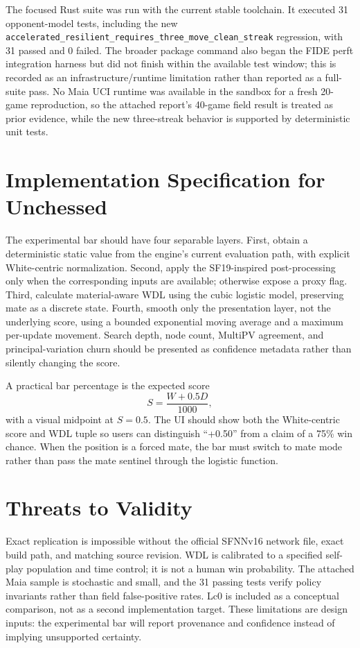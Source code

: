 \documentclass[10pt,conference]{IEEEtran}
\begin{document}
The focused Rust suite was run with the current stable toolchain. It executed 31 opponent-model tests, including the new \texttt{accelerated\_resilient\_requires\_three\_move\_clean\_streak} regression, with 31 passed and 0 failed. The broader package command also began the FIDE perft integration harness but did not finish within the available test window; this is recorded as an infrastructure/runtime limitation rather than reported as a full-suite pass. No Maia UCI runtime was available in the sandbox for a fresh 20-game reproduction, so the attached report's 40-game field result is treated as prior evidence, while the new three-streak behavior is supported by deterministic unit tests.

\section{Implementation Specification for Unchessed}
The experimental bar should have four separable layers. First, obtain a deterministic static value from the engine's current evaluation path, with explicit White-centric normalization. Second, apply the SF19-inspired post-processing only when the corresponding inputs are available; otherwise expose a proxy flag. Third, calculate material-aware WDL using the cubic logistic model, preserving mate as a discrete state. Fourth, smooth only the presentation layer, not the underlying score, using a bounded exponential moving average and a maximum per-update movement. Search depth, node count, MultiPV agreement, and principal-variation churn should be presented as confidence metadata rather than silently changing the score.

A practical bar percentage is the expected score
\begin{equation}
 S=\frac{W+0.5D}{1000},
\end{equation}
with a visual midpoint at $S=0.5$. The UI should show both the White-centric score and WDL tuple so users can distinguish ``+0.50'' from a claim of a 75\% win chance. When the position is a forced mate, the bar must switch to mate mode rather than pass the mate sentinel through the logistic function.

\section{Threats to Validity}
Exact replication is impossible without the official SFNNv16 network file, exact build path, and matching source revision. WDL is calibrated to a specified self-play population and time control; it is not a human win probability. The attached Maia sample is stochastic and small, and the 31 passing tests verify policy invariants rather than field false-positive rates. Lc0 is included as a conceptual comparison, not as a second implementation target. These limitations are design inputs: the experimental bar will report provenance and confidence instead of implying unsupported certainty.
\end{document}

